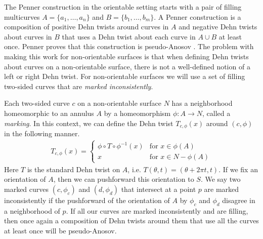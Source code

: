  The Penner construction in the orientable setting starts with a pair of filling multicurves $A = \{a_1,\dots,a_n\}$
and $B = \{b_1,\dots,b_m\}$.  A Penner construction is a composition of positive Dehn twists around curves in $A$ and negative Dehn twists about curves in $B$ that uses a Dehn twist about each curve in $A\cup B$ at least once.  Penner proves that this construction is pseudo-Anosov \cite{penner1988construction}. The problem with making this work for
non-orientable surfaces is that when defining Dehn twists about curves on a non-orientable surface, there is not a well-defined notion of a left or right Dehn twist. For non-orientable surfaces we will use a set of filling two-sided curves that are \textit{marked inconsistently}.

Each two-sided curve $c$ on a non-orientable surface $N$ has a neighborhood homeomorphic to an
annulus $A$ by a homeomorphism $\phi: A \xrightarrow{} N$, called a \textit{marking}. In this
context, we can define the Dehn twist $T_{c,\phi}(x)$ around $(c,\phi)$ in the following manner.
\begin{align*}
  T_{c,\phi}(x) =
  \begin{cases}
    \phi \circ T \circ \phi^{-1}(x) & \text{for } x \in \phi(A) \\
    x & \text{for } x \in N - \phi(A)
  \end{cases}
\end{align*}
Here $T$ is the standard Dehn twist on $A$, i.e. $T(\theta,t) = (\theta + 2\pi t,t)$. If we fix an
orientation of $A$, then we can pushforward this orientation to $S$. We say two marked curves
$(c,\phi_c)$ and $(d,\phi_d)$ that intersect at a point $p$ are marked inconsistently if the
pushforward of the orientation of $A$ by $\phi_c$ and $\phi_d$ disagree in a neighborhood of $p$.
If all our curves are marked inconsistently and are filling, then once again a composition of Dehn
twists around them that use all the curves at least once will be pseudo-Anosov.

